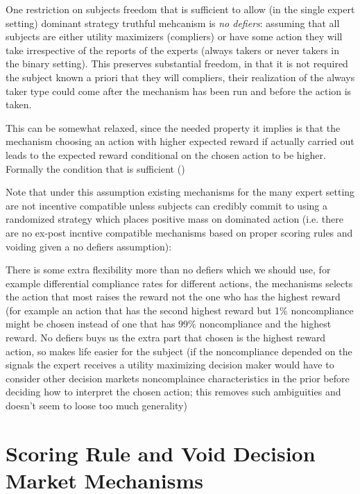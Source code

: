 One restriction on subjects freedom that is sufficient to allow (in the single expert setting) dominant strategy truthful mehcanism is \emph{no defiers}: assuming that all subjects are either utility maximizers (compliers) or have some action they will take irrespective of the reports of the experts (always takers or never takers in the binary setting).
This preserves substantial freedom, in that it is not required the subject known a priori that they will compliers, their realization of the always taker type could come after the mechanism has been run and before the action is taken. 

This can be somewhat relaxed, since the needed property it implies is that the mechanism choosing an action with higher expected reward if actually carried out leads to the expected reward conditional on the chosen action to be higher. Formally the condition that is sufficient ()

Note that under this assumption existing mechanisms for the many expert setting are not incentive compatible unless subjects can credibly commit to using a randomized strategy which places positive mass on dominated action (i.e. there are no ex-post incntive compatible mechanisms based on proper scoring rules and voiding given a no defiers assumption):

There is some extra flexibility more than no defiers which we should use, for example differential compliance rates for different actions, the mechanisms selects the action that most raises the reward not the one who has the highest reward (for example an action that has the second highest reward but 1\% noncompliance might be chosen instead of one  that has 99\% noncompliance and the highest reward. No defiers buys us the extra part that chosen is the highest reward action, so makes life easier for the subject (if the noncompliance depended on the signals the expert receives a utility maximizing decision maker would have to consider other decision markets noncomplaince characteristics in the prior before deciding how to interpret the chosen action; this removes such ambiguities and doesn't seem to loose too much generality)



\section{Scoring Rule and Void Decision Market Mechanisms}

